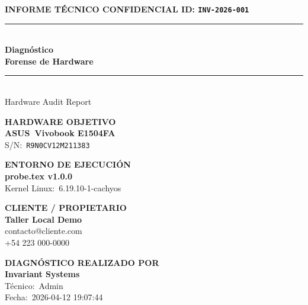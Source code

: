 \documentclass[11pt, a4paper, final]{article}
\begin{document}
\setlength{\parskip}{6pt}


\thispagestyle{empty}

\vspace*{1cm}
\noindent
{\color{AMSlate}\scriptsize\bfseries\MakeUppercase{Informe Técnico Confidencial} \hfill ID: \texttt{INV-2026-001}}\\[1ex]
{\color{AMPrimary}\rule{\linewidth}{1.5pt}}\\[4ex]

\noindent
{\color{black}\fontsize{42}{48}\selectfont\bfseries Diagnóstico}\\[1ex]
{\color{black}\fontsize{42}{48}\selectfont\bfseries Forense de Hardware} {\color{StatusCrit}\rule{14pt}{14pt}}\\[3ex]
{\color{AMSlate}\Large Hardware Audit Report}

\vspace{2.5cm}

\noindent
\begin{minipage}[t]{0.5\textwidth}
  {\scriptsize\bfseries\color{AMSlate}HARDWARE OBJETIVO}\\[1ex]
  {\Large\bfseries\color{AMPrimary}ASUS\ Vivobook E1504FA}\\[1ex]
  {\small\color{AMSlate}S/N:\ \texttt{R9N0CV12M211383}}
\end{minipage}%
\begin{minipage}[t]{0.5\textwidth}
  {\scriptsize\bfseries\color{AMSlate}ENTORNO DE EJECUCIÓN}\\[1ex]
  {\normalsize\bfseries\color{AMPrimary}probe\textcolor{redtex}{.tex} v1.0.0}\\[1ex]
  {\small\color{AMSlate}Kernel Linux:\ 6.19.10-1-cachyos}
\end{minipage}

\vspace{1.5cm}

\noindent
\begin{minipage}[t]{0.5\textwidth}
  {\scriptsize\bfseries\color{AMSlate}CLIENTE / PROPIETARIO}\\[1ex]
  {\normalsize\bfseries\color{AMPrimary}Taller Local Demo}\\[1ex]
  {\small\color{AMSlate}contacto@cliente.com}\\[0.5ex]
  {\small\color{AMSlate}+54 223 000-0000}
\end{minipage}%
\begin{minipage}[t]{0.5\textwidth}
  {\scriptsize\bfseries\color{AMSlate}DIAGNÓSTICO REALIZADO POR}\\[1ex]
  {\normalsize\bfseries\color{AMPrimary}Invariant Systems}\\[1ex]
  {\small\color{AMSlate}Técnico:\ Admin}\\[0.5ex]
  {\small\color{AMSlate}Fecha:\ 2026-04-12 19:07:44}
\end{minipage}
\end{document}
